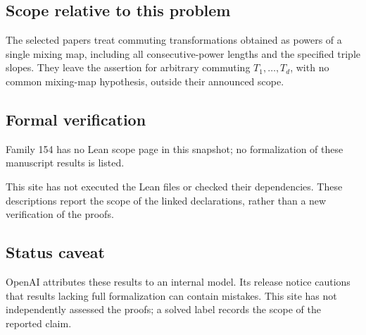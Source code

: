 \documentclass[11pt]{article}
\begin{document}
\subsection{Scope relative to this problem}
The selected papers treat commuting transformations obtained as powers of a single mixing map, including all consecutive-power lengths and the specified triple slopes. They leave the assertion for arbitrary commuting $T_1,\ldots,T_d$, with no common mixing-map hypothesis, outside their announced scope.

\subsection{Formal verification}
Family 154 has no Lean scope page in this snapshot; no formalization of these manuscript results is listed.

This site has not executed the Lean files or checked their dependencies. These descriptions report the scope of the linked declarations, rather than a new verification of the proofs.

\subsection{Status caveat}
OpenAI attributes these results to an internal model. Its release notice cautions that results lacking full formalization can contain mistakes. This site has not independently assessed the proofs; a solved label records the scope of the reported claim.
\end{document}
